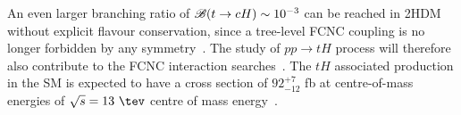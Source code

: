 An even larger branching ratio of  $\mathscr{B}(t\to cH) \sim 10^{-3}$ can be reached in 2HDM without explicit flavour conservation, since a tree-level FCNC coupling is no longer forbidden by any symmetry~\cite{Cheng:1987rs,Baum:2008qm,Chen:2013qta,Chiang:2015cba,Crivellin:2015hha,Botella:2015hoa, Gori:2017tvg,Chiang:2017fjr}. 
The study of $pp\rightarrow tH$ process will therefore also contribute to the FCNC interaction searches~\cite{Greljo:2014dka}.
The $tH$ associated production in the SM is expected to have a cross section of $92^{+7}_{-12}$ fb at centre-of-mass energies of $\sqrt{s}= 13~\tev$ centre of mass energy~\cite{deFlorian:2016spz}.

